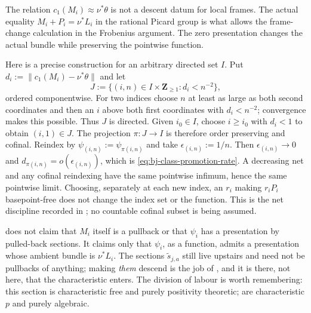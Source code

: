 \begin{remark}
\label{rem:ch43-numerical-insufficient}
The relation $c_1(M_i)\approx\nu^*\theta$ is not a descent datum for local
frames.
The actual equality $M_i+P_i=\nu^*L_i$ in the rational Picard group is what
allows the frame-change calculation in the Frobenius argument.
The zero presentation changes the actual bundle while preserving the
pointwise function.
\end{remark}

\begin{remark}
\label{rem:ch43-cofinal}
Here is a precise construction for an arbitrary directed set $I$.  Put
$d_i:=\lVert c_1(M_i)-\nu^*\theta\rVert$ and let
\[
 J:=\{(i,n)\in I\times\mathbf Z_{\ge1}:d_i<n^{-2}\},
\]
ordered componentwise.  For two indices choose $n$ at least as large
as both second coordinates and then an $i$ above both first coordinates
with $d_i<n^{-2}$; convergence makes this possible.  Thus $J$ is directed.
Given $i_0\in I$, choose $i\ge i_0$ with $d_i<1$ to obtain
$(i,1)\in J$.  The projection $\pi:J\to I$ is therefore order
preserving and cofinal.  Reindex
by $\psi_{(i,n)}:=\psi_{\pi(i,n)}$ and take
$\epsilon_{(i,n)}:=1/n$.  Then $\epsilon_{(i,n)}\to0$ and
$d_{\pi(i,n)}=o(\epsilon_{(i,n)})$, which is
\eqref{eq:bj-class-promotion-rate}.  A decreasing net and any cofinal
reindexing have the same pointwise infimum, hence the same pointwise limit.
Choosing, separately at each new index, an $r_i$ making $r_iP_i$
basepoint-free does not change the index set or the function.  This is the
net discipline recorded in ; no countable cofinal subset is
being assumed.
\end{remark}

\begin{remark}
\label{rem:ch43-promotion-not-claimed}
 does not claim that $M_i$ itself is a pullback or that $\psi_i$ has
a presentation by pulled-back sections.  It claims only that $\psi_i$, as a
function, admits a presentation whose ambient bundle is $\nu^*L_i$.  The
sections $\widetilde s_{j,a}$ still live upstairs and need not be pullbacks
of anything; making \emph{them} descend is the job of
, and it is there, not here, that the
characteristic enters.  The division of labour is worth remembering: this
section is characteristic free and purely positivity theoretic;
 are characteristic $p$ and
purely algebraic.
\end{remark}

